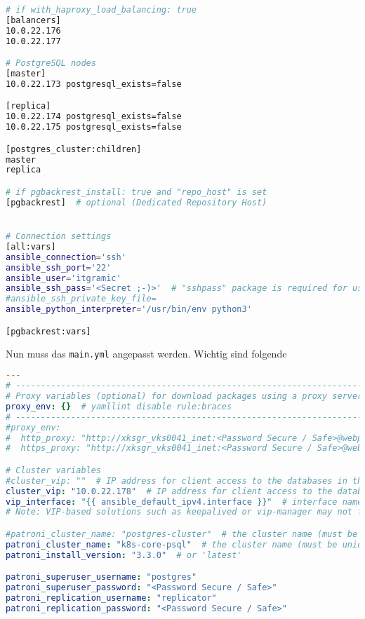 \begin{flushleft}
\begin{lstlisting}[language=bash, caption=Testsystem - Deployment - inventory,captionpos=b,label={lst:testsystem-deployment-inventory},breaklines=true]
# if with_haproxy_load_balancing: true
[balancers]
10.0.22.176
10.0.22.177

# PostgreSQL nodes
[master]
10.0.22.173 postgresql_exists=false

[replica]
10.0.22.174 postgresql_exists=false
10.0.22.175 postgresql_exists=false

[postgres_cluster:children]
master
replica

# if pgbackrest_install: true and "repo_host" is set
[pgbackrest]  # optional (Dedicated Repository Host)


# Connection settings
[all:vars]
ansible_connection='ssh'
ansible_ssh_port='22'
ansible_user='itgramic'
ansible_ssh_pass='<Secret ;-)>'  # "sshpass" package is required for use "ansible_ssh_pass"
#ansible_ssh_private_key_file=
ansible_python_interpreter='/usr/bin/env python3'

[pgbackrest:vars]

    \end{lstlisting}
    Nun muss das \texttt{main.yml} angepasst werden.
    Wichtig sind folgende
    \lstset{style=gra_codestyle}
    \begin{lstlisting}[language=yaml, caption=Testsystem - Deployment - main.yml,captionpos=b,label={lst:testsystem-deployment-main.yml},breaklines=true]
---
# ---------------------------------------------------------------------
# Proxy variables (optional) for download packages using a proxy server
proxy_env: {}  # yamllint disable rule:braces
# ---------------------------------------------------------------------
#proxy_env:
#  http_proxy: "http://xksgr_vks0041_inet:<Password Secure / Safe>@webproxy.sivc.first-it.ch:9090"
#  https_proxy: "http://xksgr_vks0041_inet:<Password Secure / Safe>@webproxy.sivc.first-it.ch:9090"

# Cluster variables
#cluster_vip: ""  # IP address for client access to the databases in the cluster (optional).
cluster_vip: "10.0.22.178"  # IP address for client access to the databases in the cluster (optional).
vip_interface: "{{ ansible_default_ipv4.interface }}"  # interface name (e.g., "ens32").
# Note: VIP-based solutions such as keepalived or vip-manager may not function correctly in cloud environments like AWS.

#patroni_cluster_name: "postgres-cluster"  # the cluster name (must be unique for each cluster)
patroni_cluster_name: "k8s-core-psql"  # the cluster name (must be unique for each cluster)
patroni_install_version: "3.3.0"  # or 'latest'

patroni_superuser_username: "postgres"
patroni_superuser_password: "<Password Secure / Safe>"
patroni_replication_username: "replicator"
patroni_replication_password: "<Password Secure / Safe>"


\end{lstlisting}
\end{flushleft}
